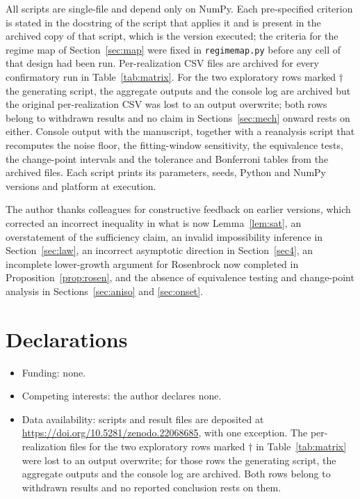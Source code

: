 \documentclass[pdflatex,sn-mathphys-num]{sn-jnl}
\theoremstyle{thmstyleone}
\theoremstyle{thmstyletwo}
\theoremstyle{thmstylethree}
\begin{document}
All scripts are single-file and depend only on NumPy. Each pre-specified criterion is stated in the docstring of the script that applies it and is present in the archived copy of that script, which is the version executed; the criteria for the regime map of Section~\ref{sec:map} were fixed in \texttt{regimemap.py} before any cell of that design had been run. Per-realization CSV files are archived for every confirmatory run in Table~\ref{tab:matrix}. For the two exploratory rows marked $\dagger$ the generating script, the aggregate outputs and the console log are archived but the original per-realization CSV was lost to an output overwrite; both rows belong to withdrawn results and no claim in Sections~\ref{sec:mech} onward rests on either. Console output with the manuscript, together with a reanalysis script that recomputes the noise floor, the fitting-window sensitivity, the equivalence tests, the change-point intervals and the tolerance and Bonferroni tables from the archived files. Each script prints its parameters, seeds, Python and NumPy versions and platform at execution.

The author thanks colleagues for constructive feedback on earlier versions, which corrected an incorrect inequality in what is now Lemma~\ref{lem:sat}, an overstatement of the sufficiency claim, an invalid impossibility inference in Section~\ref{sec:law}, an incorrect asymptotic direction in Section~\ref{sec4}, an incomplete lower-growth argument for Rosenbrock now completed in Proposition~\ref{prop:rosen}, and the absence of equivalence testing and change-point analysis in Sections~\ref{sec:aniso} and \ref{sec:onset}.

\section*{Declarations}
\begin{itemize}
\item Funding: none.
\item Competing interests: the author declares none.
\item Data availability: scripts and result files are deposited at \url{https://doi.org/10.5281/zenodo.22068685}, with one exception. The per-realization files for the two exploratory rows marked $\dagger$ in Table~\ref{tab:matrix} were lost to an output overwrite; for those rows the generating script, the aggregate outputs and the console log are archived. Both rows belong to withdrawn results and no reported conclusion rests on them.
\end{itemize}
\end{document}

